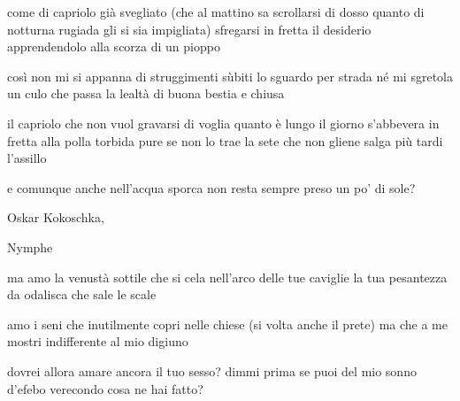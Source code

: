 \begin{poem}
	\begin{stanza}
		come di capriolo già svegliato\verseline
		(che al mattino sa scrollarsi di dosso\verseline
		quanto di notturna rugiada gli si sia impigliata)\verseline
		sfregarsi in fretta il desiderio\verseline
		apprendendolo alla scorza di un pioppo
	\end{stanza}

	\begin{stanza}
		così non mi si appanna di struggimenti\verseline
		sùbiti lo sguardo per strada\verseline
		né mi sgretola un culo che passa la lealtà\verseline
		di buona bestia e chiusa
	\end{stanza}

	\begin{stanza}
		il capriolo che non vuol gravarsi di voglia\verseline
		quanto è lungo il giorno\verseline
		s'abbevera in fretta alla polla torbida\verseline
		pure se non lo trae la sete\verseline
		che non gliene salga più tardi l'assillo
	\end{stanza}

	\begin{stanza}
		e comunque anche nell’acqua sporca\verseline
		non resta sempre preso un po' di sole?
	\end{stanza}
\end{poem}

\clearpage


\begin{artItem}
	Oskar Kokoschka, \begin{otherlanguage}{german}%
		Nymphe%
	\end{otherlanguage}
\end{artItem}

\begin{poem}
	\begin{stanza}
		ma amo la venustà sottile che si cela\verseline
		nell'arco delle tue caviglie\verseline
		la tua pesantezza da odalisca\verseline
		che sale le scale
	\end{stanza}

	\begin{stanza}
		amo i seni che inutilmente copri\verseline
		nelle chiese (si volta anche il prete)\verseline
		ma che a me mostri indifferente\verseline
		al mio digiuno
	\end{stanza}

	\begin{stanza}
		dovrei allora amare ancora\verseline
		il tuo sesso? dimmi prima se puoi\verseline
		del mio sonno d'efebo verecondo\verseline
		cosa ne hai fatto?
	\end{stanza}
\end{poem}

